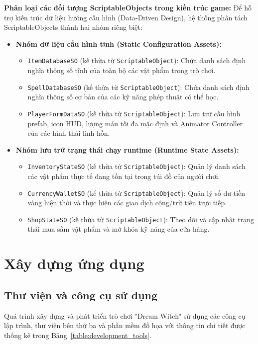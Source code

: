 \documentclass[../DoAn.tex]{subfiles}
\begin{document}
\textbf{Phân loại các đối tượng ScriptableObjects trong kiến trúc game:}
Để hỗ trợ kiến trúc dữ liệu hướng cấu hình (Data-Driven Design), hệ thống phân tách ScriptableObjects thành hai nhóm riêng biệt:
\begin{itemize}
    \item \textbf{Nhóm dữ liệu cấu hình tĩnh (Static Configuration Assets):}
    \begin{itemize}
        \item \texttt{ItemDatabaseSO} (kế thừa từ \texttt{ScriptableObject}): Chứa danh sách định nghĩa thông số tĩnh của toàn bộ các vật phẩm trong trò chơi.
        \item \texttt{SpellDatabaseSO} (kế thừa từ \texttt{ScriptableObject}): Chứa danh sách định nghĩa thông số cơ bản của các kỹ năng phép thuật có thể học.
        \item \texttt{PlayerFormDataSO} (kế thừa từ \texttt{ScriptableObject}): Lưu trữ cấu hình prefab, icon HUD, lượng máu tối đa mặc định và Animator Controller của các hình thái linh hồn.
    \end{itemize}
    \item \textbf{Nhóm lưu trữ trạng thái chạy runtime (Runtime State Assets):}
    \begin{itemize}
        \item \texttt{InventoryStateSO} (kế thừa từ \texttt{ScriptableObject}): Quản lý danh sách các vật phẩm thực tế đang tồn tại trong túi đồ của người chơi.
        \item \texttt{CurrencyWalletSO} (kế thừa từ \texttt{ScriptableObject}): Quản lý số dư tiền vàng hiện thời và thực hiện các giao dịch cộng/trừ tiền trực tiếp.
        \item \texttt{ShopStateSO} (kế thừa từ \texttt{ScriptableObject}): Theo dõi và cập nhật trạng thái mua sắm vật phẩm và mở khóa kỹ năng của cửa hàng.
    \end{itemize}
\end{itemize}


\section{Xây dựng ứng dụng}
\label{section:5.4}

\subsection{Thư viện và công cụ sử dụng}
\label{subsection:5.4.1}
Quá trình xây dựng và phát triển trò chơi "Dream Witch" sử dụng các công cụ lập trình, thư viện bên thứ ba và phần mềm đồ họa với thông tin chi tiết được thống kê trong Bảng~\ref{table:development_tools}.
\end{document}
